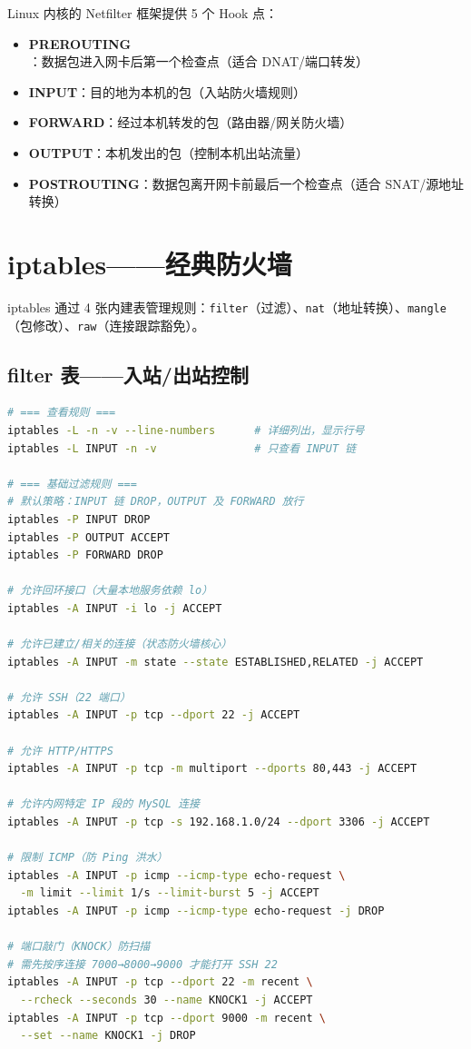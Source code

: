 \documentclass[12pt,UTF8]{ctexbook}
\begin{document}
Linux 内核的 Netfilter 框架提供 5 个 Hook 点：
\begin{itemize}
    \item \textbf{PREROUTING}：数据包进入网卡后第一个检查点（适合 DNAT/端口转发）
    \item \textbf{INPUT}：目的地为本机的包（入站防火墙规则）
    \item \textbf{FORWARD}：经过本机转发的包（路由器/网关防火墙）
    \item \textbf{OUTPUT}：本机发出的包（控制本机出站流量）
    \item \textbf{POSTROUTING}：数据包离开网卡前最后一个检查点（适合 SNAT/源地址转换）
\end{itemize}

\section{iptables——经典防火墙}

iptables 通过 4 张内建表管理规则：\texttt{filter}（过滤）、\texttt{nat}（地址转换）、\texttt{mangle}（包修改）、\texttt{raw}（连接跟踪豁免）。

\subsection{filter 表——入站/出站控制}

\begin{lstlisting}[language=bash]
# === 查看规则 ===
iptables -L -n -v --line-numbers      # 详细列出，显示行号
iptables -L INPUT -n -v               # 只查看 INPUT 链

# === 基础过滤规则 ===
# 默认策略：INPUT 链 DROP，OUTPUT 及 FORWARD 放行
iptables -P INPUT DROP
iptables -P OUTPUT ACCEPT
iptables -P FORWARD DROP

# 允许回环接口（大量本地服务依赖 lo）
iptables -A INPUT -i lo -j ACCEPT

# 允许已建立/相关的连接（状态防火墙核心）
iptables -A INPUT -m state --state ESTABLISHED,RELATED -j ACCEPT

# 允许 SSH（22 端口）
iptables -A INPUT -p tcp --dport 22 -j ACCEPT

# 允许 HTTP/HTTPS
iptables -A INPUT -p tcp -m multiport --dports 80,443 -j ACCEPT

# 允许内网特定 IP 段的 MySQL 连接
iptables -A INPUT -p tcp -s 192.168.1.0/24 --dport 3306 -j ACCEPT

# 限制 ICMP（防 Ping 洪水）
iptables -A INPUT -p icmp --icmp-type echo-request \
  -m limit --limit 1/s --limit-burst 5 -j ACCEPT
iptables -A INPUT -p icmp --icmp-type echo-request -j DROP

# 端口敲门（KNOCK）防扫描
# 需先按序连接 7000→8000→9000 才能打开 SSH 22
iptables -A INPUT -p tcp --dport 22 -m recent \
  --rcheck --seconds 30 --name KNOCK1 -j ACCEPT
iptables -A INPUT -p tcp --dport 9000 -m recent \
  --set --name KNOCK1 -j DROP
\end{lstlisting}
\end{document}
